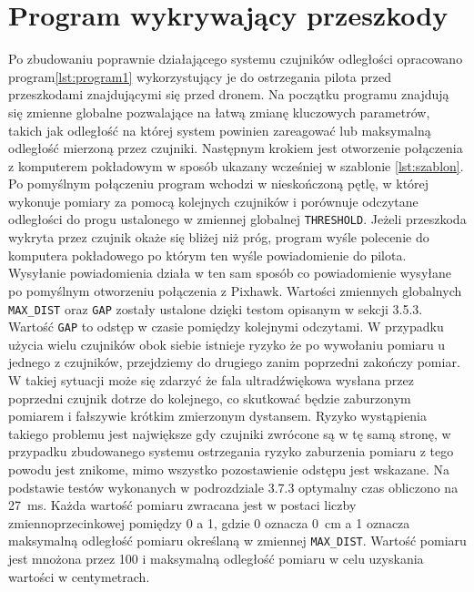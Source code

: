 \documentclass[a4paper,12pt]{book}
\begin{document}
    \section{Program wykrywający przeszkody}
        Po zbudowaniu poprawnie działającego systemu czujników odległości opracowano program\ref{lst:program1} wykorzystujący je do ostrzegania pilota przed przeszkodami znajdującymi się przed dronem. 
        Na początku programu znajdują się zmienne globalne pozwalające na łatwą zmianę kluczowych parametrów, takich jak odległość na której system powinien zareagować lub maksymalną 
        odległość mierzoną przez czujniki. Następnym krokiem jest otworzenie połączenia z komputerem pokładowym w sposób ukazany wcześniej w szablonie \ref{lst:szablon}. Po pomyślnym 
        połączeniu program wchodzi w nieskończoną pętlę, w której wykonuje pomiary za pomocą kolejnych czujników i porównuje odczytane odległości do progu ustalonego w zmiennej globalnej \texttt{THRESHOLD}. 
        Jeżeli przeszkoda wykryta przez czujnik okaże się bliżej niż próg, program wyśle polecenie do komputera pokładowego po którym ten wyśle powiadomienie do pilota. Wysyłanie powiadomienia 
        działa w ten sam sposób co powiadomienie wysyłane po pomyślnym otworzeniu połączenia z Pixhawk. Wartości zmiennych globalnych \texttt{MAX\_DIST} oraz \texttt{GAP} zostały ustalone dzięki testom opisanym w sekcji 3.5.3. 
        Wartość \texttt{GAP} to odstęp w czasie pomiędzy kolejnymi odczytami. W przypadku użycia wielu czujników obok siebie istnieje ryzyko że po wywołaniu pomiaru u jednego z czujników, przejdziemy do drugiego zanim poprzedni 
        zakończy pomiar. W takiej sytuacji może się zdarzyć że fala ultradźwiękowa wysłana przez poprzedni czujnik dotrze do kolejnego, co skutkować będzie zaburzonym pomiarem i fałszywie krótkim zmierzonym dystansem. 
        Ryzyko wystąpienia takiego problemu jest największe gdy czujniki zwrócone są w tę samą stronę, w przypadku zbudowanego systemu ostrzegania ryzyko zaburzenia pomiaru z tego powodu jest znikome, 
        mimo wszystko pozostawienie odstępu jest wskazane. Na podstawie testów wykonanych w podrozdziale 3.7.3 optymalny czas obliczono na 27~ms. Każda wartość pomiaru zwracana jest w postaci liczby 
        zmiennoprzecinkowej pomiędzy 0 a 1, gdzie 0 oznacza 0~cm a 1 oznacza maksymalną odległość pomiaru określaną w zmiennej \texttt{MAX\_DIST}. Wartość pomiaru jest mnożona przez 100 i maksymalną odległość pomiaru w celu 
        uzyskania wartości w centymetrach.
\end{document}
